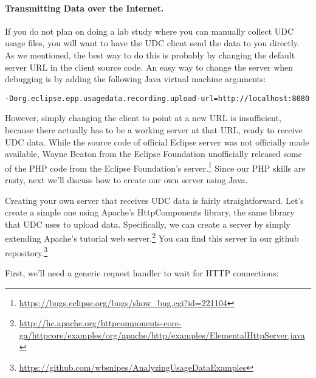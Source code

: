 \paragraph{Transmitting Data over the Internet.}

If you do not plan on doing a lab study where you can manually collect UDC usage
files, you will want to have the UDC client send the data to you directly.
As we mentioned, the best way to do this is probably by changing the default
server URL in the client source code.
An easy way to change the server when debugging is by adding the following Java
virtual machine arguments:

\begin{lstlisting}
-Dorg.eclipse.epp.usagedata.recording.upload-url=http://localhost:8080
\end{lstlisting}

\noindent
However, simply changing the client to point at a new URL is insufficient,
because there actually has to be a working server at that URL, ready to
receive UDC data.
While the source code of official Eclipse server was not officially made
available, Wayne Beaton from the Eclipse Foundation unofficially released
some of the PHP code from the Eclipse Foundation's server.\footnote{\url{https://bugs.eclipse.org/bugs/show_bug.cgi?id=221104}}
Since our PHP skills are rusty, next we'll discuss how to create our own 
server using Java.

Creating your own server that receives UDC data is fairly straightforward.
Let's create a simple one using Apache's HttpComponents library,
the same library that UDC uses to upload data.
Specifically, we can create a server by simply extending Apache's tutorial
web server.\footnote{\url{http://hc.apache.org/httpcomponents-core-ga/httpcore/examples/org/apache/http/examples/ElementalHttpServer.java}}
You can find this server in our github repository.\footnote{\url{https://github.com/wbsnipes/AnalyzingUsageDataExamples}}

First, we'll need a generic request handler to wait for HTTP connections:

